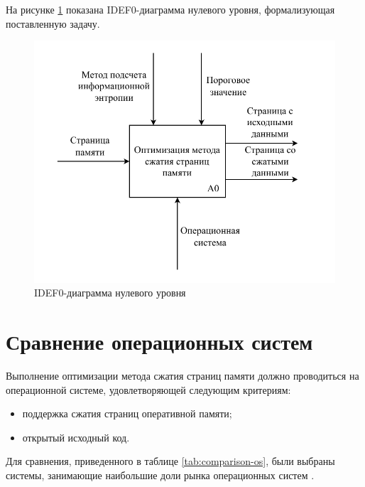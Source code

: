 На рисунке \ref{img:zero-level} показана IDEF0-диаграмма нулевого уровня, формализующая поставленную задачу.

\begin{figure}[H]
	\begin{center}
		\includegraphics[scale=0.7]{inc/img/zero-level.pdf}
	\end{center}
	\captionsetup{justification=centering}
	\caption{IDEF0-диаграмма нулевого уровня}
	\label{img:zero-level}
\end{figure}

\section{Сравнение операционных систем}\label{os}

Выполнение оптимизации метода сжатия страниц памяти должно проводиться на операционной системе, удовлетворяющей следующим критериям:

\begin{itemize}
	\item поддержка сжатия страниц оперативной памяти;
	\item открытый исходный код.
\end{itemize}

Для сравнения, приведенного в таблице \ref{tab:comparison-os}, были выбраны системы, занимающие наибольшие доли рынка операционных систем \cite{stat}.

